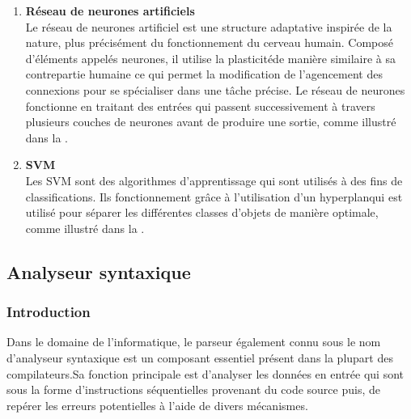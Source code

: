 \documentclass{rapport}
\begin{document}
\begin{enumerate}
    \item \textbf{Réseau de neurones artificiels}\\
    Le réseau de neurones artificiel est une structure adaptative inspirée de la nature, plus précisément du fonctionnement du cerveau humain. Composé d'éléments appelés neurones\footnotemark[2], il utilise la plasticité\footnotemark[3] de manière similaire à sa contrepartie humaine ce qui permet la modification de l'agencement des connexions pour se spécialiser dans une tâche précise. Le réseau de neurones fonctionne en traitant des entrées qui passent successivement à travers plusieurs couches de neurones avant de produire une sortie, comme illustré dans la . 
     \\
    
    \item \textbf{SVM}\\
    Les SVM sont des algorithmes d'apprentissage qui sont utilisés à des fins de classifications. Ils fonctionnement grâce à l'utilisation d'un hyperplan\footnotemark[4] qui est utilisé pour séparer les différentes classes d'objets de manière optimale, comme illustré dans la . 
    
\end{enumerate}

\newpage
\subsection{Analyseur syntaxique}
\subsubsection{Introduction}
Dans le domaine de l'informatique, le parseur également connu sous le nom d'analyseur syntaxique est un composant essentiel présent dans la plupart des compilateurs.\footnotemark[1] Sa fonction principale est d'analyser les données en entrée qui sont sous la forme d'instructions séquentielles provenant du code source puis, de repérer les erreurs potentielles à l'aide de divers mécanismes.
\end{document}
